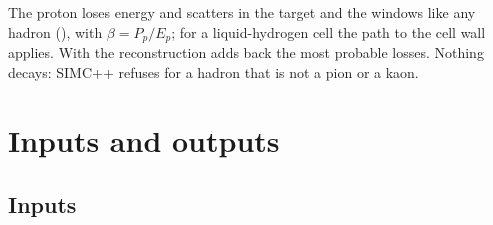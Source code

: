 \documentclass{simcnote}
\begin{document}
The proton loses energy and scatters in the target and the windows like any hadron (), with
$\beta=P_p/E_p$; for a liquid-hydrogen cell the path to the cell wall applies. With  the
reconstruction adds back the most probable losses. Nothing decays: SIMC++ refuses  for a hadron
that is not a pion or a kaon.

\section{Inputs and outputs}
\subsection{Inputs}
\end{document}
